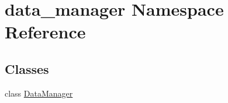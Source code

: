 \hypertarget{namespacedata__manager}{\section{data\-\_\-manager Namespace Reference}
\label{namespacedata__manager}
}
\subsection*{Classes}
\begin{DoxyCompactItemize}
\item 
class \hyperlink{classdata__manager_1_1_data_manager}{Data\-Manager}
\end{DoxyCompactItemize}
